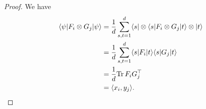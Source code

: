 \begin{proof}
	We have
	\begin{align*}
		\langle {\psi} \vert F_i\otimes G_j \vert {\psi} \rangle &= \frac{1}{d} \sum_{s,t=1}^d \langle {s} \vert\otimes\langle {s} \vert F_i\otimes G_j \vert {t} \rangle\otimes \vert {t} \rangle \\
		&= \frac{1}{d} \sum_{s,t=1}^d \langle {s} \vert F_i \vert {t} \rangle \langle {s} \vert G_j \vert {t} \rangle \\
		&= \frac{1}{d} \text{Tr} \, {F_iG_j^\top} \\
		&= \langle{x_i},{y_j}\rangle.
	\end{align*}
	
%			
\end{proof}
\newpage